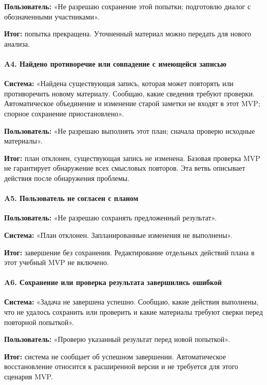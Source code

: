 \textbf{Пользователь:} «Не разрешаю сохранение этой попытки; подготовлю диалог с обозначенными участниками».


\textbf{Итог:} попытка прекращена. Уточненный материал можно передать для нового анализа.


\paragraph{A4. Найдено противоречие или совпадение с имеющейся записью}

\textbf{Система:} «Найдена существующая запись, которая может повторять или противоречить новому материалу. Сообщаю, какие сведения требуют проверки. Автоматическое объединение и изменение старой заметки не входят в этот MVP; спорное сохранение приостановлено».


\textbf{Пользователь:} «Не разрешаю выполнять этот план; сначала проверю исходные материалы».


\textbf{Итог:} план отклонен, существующая запись не изменена. Базовая проверка MVP не гарантирует обнаружение всех смысловых повторов. Эта ветвь описывает действия после обнаружения проблемы.


\paragraph{A5. Пользователь не согласен с планом}

\textbf{Пользователь:} «Не разрешаю сохранять предложенный результат».


\textbf{Система:} «План отклонен. Запланированные изменения не выполнены».


\textbf{Итог:} завершение без сохранения. Редактирование отдельных действий плана в этот учебный MVP не включено.


\paragraph{A6. Сохранение или проверка результата завершились ошибкой}

\textbf{Система:} «Задача не завершена успешно. Сообщаю, какие действия выполнены, что не удалось сохранить или проверить и какие материалы требуют сверки перед повторной попыткой».


\textbf{Пользователь:} «Проверю указанный результат перед новой попыткой».


\textbf{Итог:} система не сообщает об успешном завершении. Автоматическое восстановление относится к расширенной версии и не требуется для этого сценария MVP.



